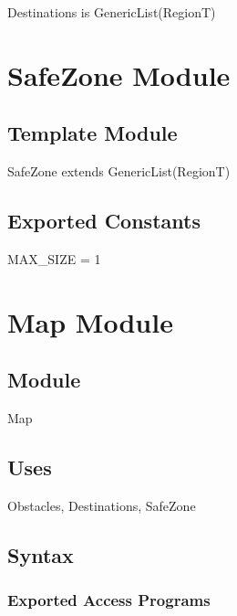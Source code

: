 \documentclass[12pt]{article}
\begin{document}
Destinations is GenericList(RegionT)

\section* {SafeZone Module}

\subsection* {Template Module}

SafeZone extends GenericList(RegionT)

\subsection*{Exported Constants}
MAX\_SIZE = 1




\newpage

\section* {Map Module}

\subsection* {Module}

Map

\subsection* {Uses}

Obstacles, Destinations, SafeZone

\subsection* {Syntax}

\subsubsection* {Exported Access Programs}
\end{document}
